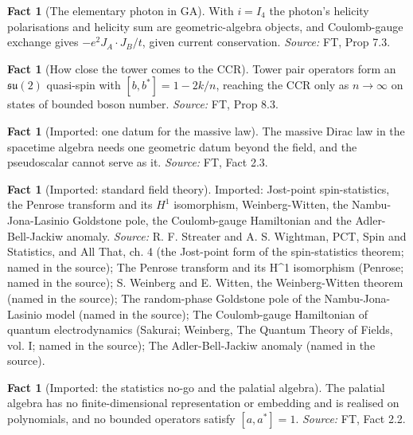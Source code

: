 \documentclass[11pt]{article}
\theoremstyle{definition}
\newtheorem{fact}[theorem]{Fact}
\theoremstyle{plain}
\begin{document}
\begin{fact}[The elementary photon in GA]\label{c:field-theory.elementary-photon-ga}
With $i = I_4$ the photon's helicity polarisations and helicity sum are geometric-algebra objects, and Coulomb-gauge exchange gives $-e^2J_A\cdot J_B/t$, given current conservation.
\emph{Source:} FT, Prop 7.3.
\end{fact}

\begin{fact}[How close the tower comes to the CCR]\label{c:field-theory.how-close-tower-comes-ccr}
Tower pair operators form an $\mathfrak{su}(2)$ quasi-spin with $[b, b^*] = 1 - 2k/n$, reaching the CCR only as $n \to \infty$ on states of bounded boson number.
\emph{Source:} FT, Prop 8.3.
\end{fact}

\begin{fact}[Imported: one datum for the massive law]\label{c:field-theory.imported-one-datum-massive-law}
The massive Dirac law in the spacetime algebra needs one geometric datum beyond the field, and the pseudoscalar cannot serve as it.
\emph{Source:} FT, Fact 2.3.
\end{fact}

\begin{fact}[Imported: standard field theory]\label{c:field-theory.imported-standard-field-theory}
Imported: Jost-point spin-statistics, the Penrose transform and its $H^1$ isomorphism, Weinberg-Witten, the Nambu-Jona-Lasinio Goldstone pole, the Coulomb-gauge Hamiltonian and the Adler-Bell-Jackiw anomaly.
\emph{Source:} R. F. Streater and A. S. Wightman, PCT, Spin and Statistics, and All That, ch. 4 (the Jost-point form of the spin-statistics theorem; named in the source); The Penrose transform and its H\^{}1 isomorphism (Penrose; named in the source); S. Weinberg and E. Witten, the Weinberg-Witten theorem (named in the source); The random-phase Goldstone pole of the Nambu-Jona-Lasinio model (named in the source); The Coulomb-gauge Hamiltonian of quantum electrodynamics (Sakurai; Weinberg, The Quantum Theory of Fields, vol. I; named in the source); The Adler-Bell-Jackiw anomaly (named in the source).
\end{fact}

\begin{fact}[Imported: the statistics no-go and the palatial algebra]\label{c:field-theory.imported-statistics-no-go-palatial-algebra}
The palatial algebra has no finite-dimensional representation or embedding and is realised on polynomials, and no bounded operators satisfy $[a, a^*] = 1$.
\emph{Source:} FT, Fact 2.2.
\end{fact}
\end{document}
